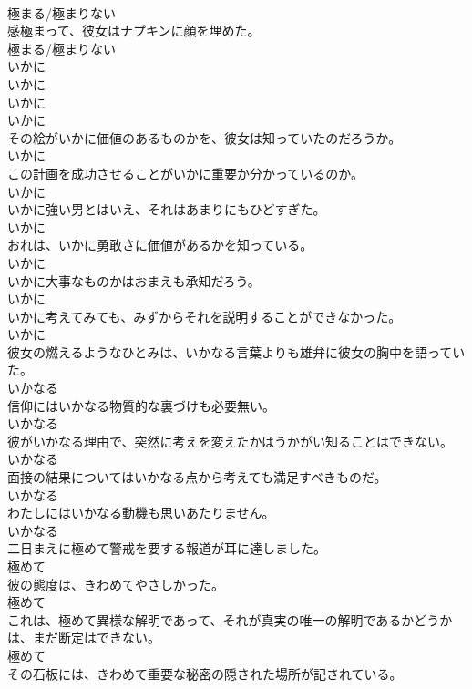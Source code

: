 \documentclass[8pt]{extreport}
\begin{document}
\begin{CJK}{UTF8}{min}
\\	極まる/極まりない
\\	感極まって、彼女はナプキンに顔を埋めた。	
\\	極まる/極まりない
\\	いかに 
\\	いかに 
\\	いかに 
\\	いかに
\\	その絵がいかに価値のあるものかを、彼女は知っていたのだろうか。	
\\	いかに
\\	この計画を成功させることがいかに重要か分かっているのか。	
\\	いかに
\\	いかに強い男とはいえ、それはあまりにもひどすぎた。	
\\	いかに
\\	おれは、いかに勇敢さに価値があるかを知っている。	
\\	いかに
\\	いかに大事なものかはおまえも承知だろう。	
\\	いかに
\\	いかに考えてみても、みずからそれを説明することができなかった。	
\\	いかに
\\	彼女の燃えるようなひとみは、いかなる言葉よりも雄弁に彼女の胸中を語っていた。	
\\	いかなる
\\	信仰にはいかなる物質的な裏づけも必要無い。	
\\	いかなる
\\	彼がいかなる理由で、突然に考えを変えたかはうかがい知ることはできない。	
\\	いかなる
\\	面接の結果についてはいかなる点から考えても満足すべきものだ。	
\\	いかなる
\\	わたしにはいかなる動機も思いあたりません。	
\\	いかなる
\\	二日まえに極めて警戒を要する報道が耳に達しました。	
\\	極めて
\\	彼の態度は、きわめてやさしかった。	
\\	極めて
\\	これは、極めて異様な解明であって、それが真実の唯一の解明であるかどうかは、まだ断定はできない。	
\\	極めて
\\	その石板には、きわめて重要な秘密の隠された場所が記されている。	

\end{CJK}
\end{document}
